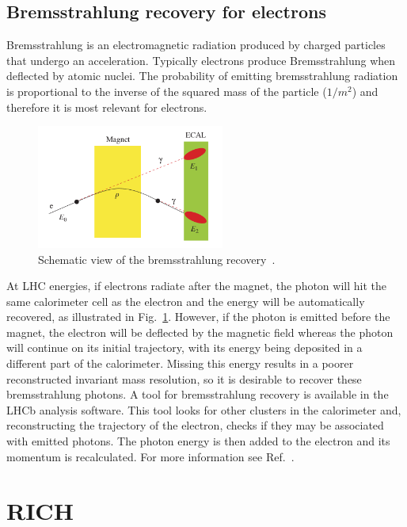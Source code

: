 \subsection{Bremsstrahlung recovery for electrons}

Bremsstrahlung is an electromagnetic radiation produced by charged particles that undergo an acceleration. 
Typically electrons produce Bremsstrahlung when deflected by atomic nuclei.
The probability of emitting bremsstrahlung radiation is proportional to the inverse of the squared mass of the
particle ($1/m^2$) and therefore it is most relevant for electrons.
%
\begin{figure}[h!]
\centering
\includegraphics[width=0.55\textwidth]{RKst/figs/brem_recovery.png}
\caption{Schematic view of the bremsstrahlung recovery~\cite{Alves:2008zz}. }
\label{fig:bremreco}
\end{figure}
%
At LHC energies, if electrons radiate after the magnet, the photon will hit the same calorimeter cell
 as the electron and the energy will be automatically recovered, as illustrated in Fig.~\ref{fig:bremreco}.
However, if the photon is emitted before the magnet, the electron will be deflected by the magnetic
field whereas the photon will continue on its initial trajectory, with its energy being deposited in a different
part of the calorimeter. Missing this energy results in a poorer reconstructed invariant mass resolution, so it is
desirable to recover these bremsstrahlung photons. A tool for bremsstrahlung recovery is available
in the LHCb analysis software. This tool looks for other clusters in the calorimeter and, reconstructing the trajectory
of the electron, checks if they may be associated with emitted photons. The photon energy is then added to 
the electron and its momentum is recalculated. 
For more information see Ref.~\cite{LHCb:2003ab}.

\section{RICH}

